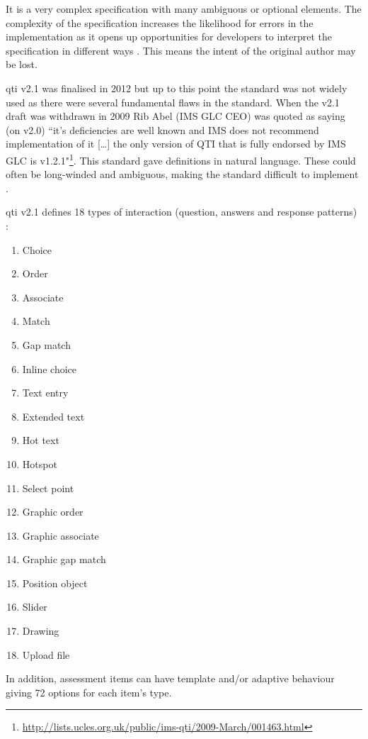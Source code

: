 It is a very complex specification with many ambiguous or optional elements. The complexity of the specification increases the likelihood for errors in the implementation as it opens up opportunities for developers to interpret the specification in different ways \citep{failQTI}. This means the intent of the original author may be lost.

\gls{qti} v2.1 was finalised in 2012 \citep{qtiOverview} but up to this point the standard was not widely used \citep{eps265979} as there were several fundamental flaws in the standard. When the v2.1 draft was withdrawn in 2009 Rib Abel (IMS GLC CEO) was quoted as saying (on v2.0) ``it’s deficiencies are well known and IMS does not recommend implementation of it [\dots] the only version of QTI that is fully endorsed by IMS GLC is v1.2.1"\footnote{\url{http://lists.ucles.org.uk/public/ims-qti/2009-March/001463.html}}. This standard gave definitions in natural language. These could often be long-winded and ambiguous, making the standard difficult to implement \citep{failQTI, Sclater2007}.

\gls{qti} v2.1 defines 18 types of interaction (question, answers and response patterns) \citep{qtiImplementation}:
\begin{multicols}{3}
\begin{enumerate}
\item Choice
\item Order
\item Associate
\item Match
\item Gap match
\item Inline choice
\item Text entry
\item Extended text
\item Hot text
\item Hotspot
\item Select point
\item Graphic order
\item Graphic associate
\item Graphic gap match
\item Position object
\item Slider
\item Drawing
\item Upload file
\end{enumerate}
\end{multicols}

In addition, assessment items can have template and/or adaptive behaviour giving 72 options for each item's type. 

